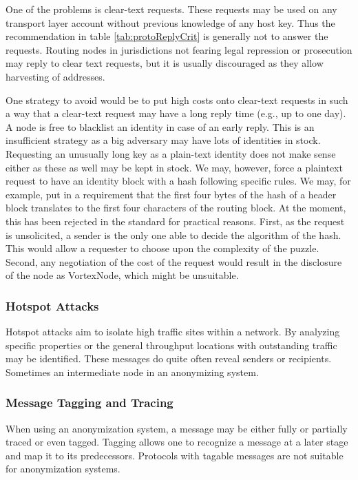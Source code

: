 One of the problems is clear-text requests. These requests may be used on any transport layer account without previous knowledge of any host key. Thus the recommendation in table \ref{tab:protoReplyCrit} is generally not to answer the requests. Routing nodes in jurisdictions not fearing legal repression or prosecution may reply to clear text requests, but it is usually discouraged as they allow harvesting of addresses.

One strategy to avoid would be to put high costs onto clear-text requests in such a way that a clear-text request may have a long reply time (e.g., up to one day). A node is free to blacklist an identity in case of an early reply. This is an insufficient strategy as a big adversary may have lots of identities in stock. Requesting an unusually long key as a plain-text identity does not make sense either as these as well may be kept in stock. We may, however, force a plaintext request to have an identity block with a hash following specific rules. We may, for example, put in a requirement that the first four bytes of the hash of a header block translates to the first four characters of the routing block. At the moment, this has been rejected in the standard for practical reasons. First, as the request is unsolicited, a sender is the only one able to decide the algorithm of the hash. This would allow a requester to choose upon the complexity of the puzzle. Second, any negotiation of the cost of the request would result in the disclosure of the node as VortexNode, which might be unsuitable.

\subsubsection{Hotspot Attacks}
Hotspot attacks aim to isolate high traffic sites within a network. By analyzing specific properties or the general throughput locations with outstanding traffic may be identified. These messages do quite often reveal senders or recipients. Sometimes an intermediate node in an anonymizing system. 

\subsubsection{Message Tagging and Tracing}
When using an anonymization system, a message may be either fully or partially traced or even tagged. Tagging allows one to recognize a message at a later stage and map it to its predecessors. Protocols with tagable messages are not suitable for anonymization systems.


